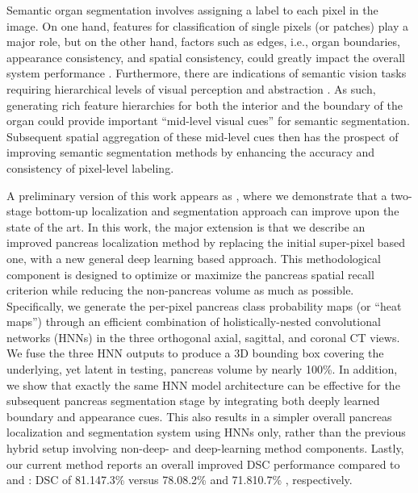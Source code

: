 \documentclass[journal]{IEEEtran}
\begin{document}
Semantic organ segmentation involves assigning a label to each pixel in the image. On one hand, features for classification of single pixels (or patches) play a major role, but on the other hand, factors such as edges, i.e., organ boundaries, appearance consistency, and spatial consistency, could greatly impact the overall system performance \cite{zheng2015conditional}. Furthermore, there are indications of semantic vision tasks requiring hierarchical levels of visual perception and abstraction \cite{xie2015holistically}. As such, generating rich feature hierarchies for both the interior and the boundary of the organ could provide important ``mid-level visual cues'' for semantic segmentation. Subsequent spatial aggregation of these mid-level cues then has the prospect of improving semantic segmentation methods by enhancing the accuracy and consistency of pixel-level labeling.

A preliminary version of this work appears as \cite{roth2016spatial}, where we demonstrate that a two-stage bottom-up localization and segmentation approach can improve upon the state of the art. In this work, the major extension is that we describe an improved pancreas localization method by replacing the initial super-pixel based one, with a new general deep learning based approach. This methodological component is designed to optimize or maximize the pancreas spatial recall criterion while reducing the non-pancreas volume as much as possible. Specifically, we generate the per-pixel pancreas class probability maps (or ``heat maps'') through an efficient combination of holistically-nested convolutional networks (HNNs) in the three orthogonal axial, sagittal, and coronal CT views. We fuse the three HNN outputs to produce a 3D bounding box covering the underlying, yet latent in testing, pancreas volume by nearly 100\%. In addition, we show that exactly the same HNN model architecture can be effective for the subsequent pancreas segmentation stage by integrating both deeply learned boundary and appearance cues. This also results in a simpler overall pancreas localization and segmentation system using HNNs only, rather than the previous hybrid setup involving non-deep- and deep-learning method components\cite{roth2016spatial}. Lastly, our current method reports an overall improved DSC performance compared to \cite{roth2016spatial} and \cite{roth2015deeporgan}: DSC of 81.147.3\% versus 78.08.2\% and 71.810.7\% \cite{roth2015deeporgan}, respectively.   
\end{document}
